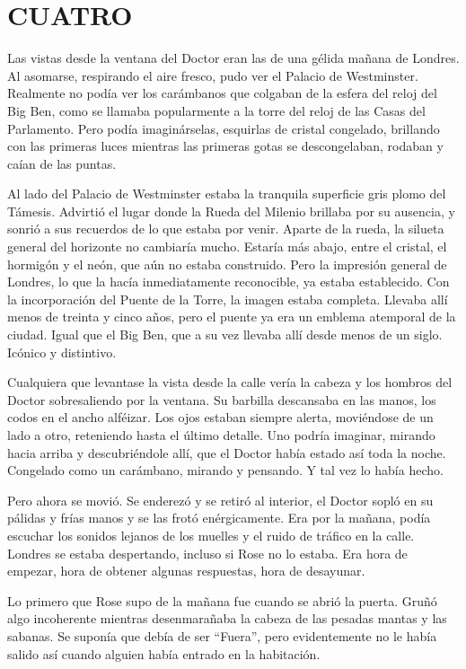 \chapter*{CUATRO}

{Las vistas desde la ventana del Doctor eran las de una gélida mañana de
	Londres. Al asomarse, respirando el aire fresco, pudo ver el Palacio de
	Westminster. Realmente no podía ver los carámbanos que colgaban de la
	esfera del reloj del Big Ben, como se llamaba popularmente a la torre
	del reloj de las Casas del Parlamento. Pero podía imaginárselas,
	esquirlas de cristal congelado, brillando con las primeras luces
	mientras las primeras gotas se descongelaban, rodaban y caían de las
puntas.}

{Al lado del Palacio de Westminster estaba la tranquila superficie gris
	plomo del Támesis. Advirtió el lugar donde la Rueda del Milenio brillaba
	por su ausencia, y sonrió a sus recuerdos de lo que estaba por venir.
	Aparte de la rueda, la silueta general del horizonte no cambiaría mucho.
	Estaría más abajo, entre el cristal, el hormigón y el neón, que aún no
	estaba construido. Pero la impresión general de Londres, lo que la hacía
	inmediatamente reconocible, ya estaba establecido. Con la incorporación
	del Puente de la Torre, la imagen estaba completa. Llevaba allí menos de
	treinta y cinco años, pero el puente ya era un emblema atemporal de la
	ciudad. Igual que el Big Ben, que a su vez llevaba allí desde menos de
un siglo. Icónico y distintivo.}

{Cualquiera que levantase la vista desde la calle vería la cabeza y los
	hombros del Doctor sobresaliendo por la ventana. Su barbilla descansaba
	en las manos, los codos en el ancho alféizar. Los ojos estaban siempre
	alerta, moviéndose de un lado a otro, reteniendo hasta el último
	detalle. Uno podría imaginar, mirando hacia arriba y descubriéndole
	allí, que el Doctor había estado así toda la noche. Congelado como un
carámbano, mirando y pensando. Y tal vez lo había hecho.}

{Pero ahora se movió. Se enderezó y se retiró al interior, el Doctor
	sopló en su pálidas y frías manos y se las frotó enérgicamente. Era por
	la mañana, podía escuchar los sonidos lejanos de los muelles y el ruido
	de tráfico en la calle. Londres se estaba despertando, incluso si Rose
	no lo estaba. Era hora de empezar, hora de obtener algunas respuestas,
hora de desayunar.}

{Lo primero que Rose supo de la mañana fue cuando se abrió la puerta.
	Gruñó algo incoherente mientras desenmarañaba la cabeza de las pesadas
	mantas y las sabanas. Se suponía que debía de ser ``Fuera'', pero
	evidentemente no le había salido así cuando alguien había entrado en la
habitación.}

